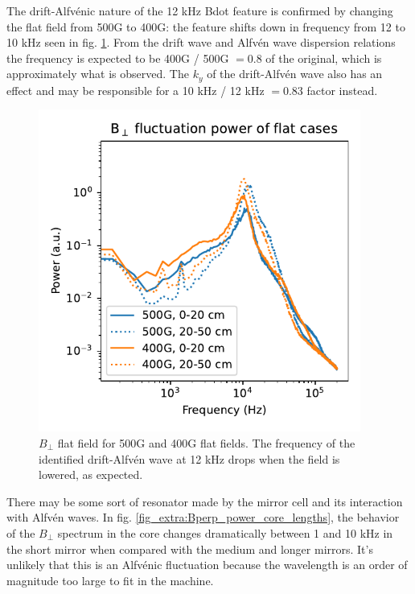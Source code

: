 The drift-Alfv\'enic nature of the 12 kHz Bdot feature is confirmed by changing the flat field from 500G to 400G: the feature shifts down in frequency from 12 to 10 kHz seen in fig. \ref{fig_extra:bperp_500G-vs-400G}. From the drift wave and Alfv\'en wave dispersion relations the frequency is expected to be 400G / 500G $= 0.8$ of the original, which is approximately what is observed. The $k_y$ of the drift-Alfv\'en wave also has an effect and may be responsible for a 10 kHz / 12 kHz $= 0.83$ factor instead. 
\begin{figure}
    \centering
    \includegraphics[width=300pt]{figures/extra/Bperp_fluct_power_M=1_400G_500G.pdf}
    \caption[$B_\perp$, flat field 500G vs 400G]{$B_\perp$ flat field for 500G and 400G flat fields. The frequency of the identified drift-Alfv\'en wave at 12 kHz drops when the field is lowered, as expected.}
    \label{fig_extra:bperp_500G-vs-400G}
\end{figure}

There may be some sort of resonator made by the mirror cell and its interaction with Alfv\'en waves. In fig. \ref{fig_extra:Bperp_power_core_lengths}, the behavior of the $B_\perp$ spectrum in the core changes dramatically between 1 and 10 kHz in the short mirror when compared with the medium and longer mirrors. It's unlikely that this is an Alfv\'enic fluctuation because the wavelength is an order of magnitude too large to fit in the machine. 

